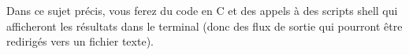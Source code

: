 \vspace*{1cm}


\noindent Dans ce sujet précis, vous ferez du code en C et des appels à des scripts shell qui afficheront les résultats dans le terminal (donc des flux de sortie qui pourront être redirigés vers un fichier texte).








